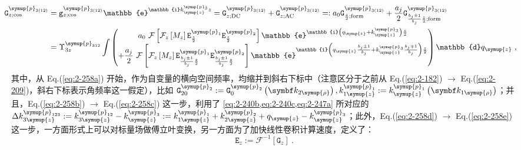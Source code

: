 \begin{subequations} \label{eq:2-261}
	\abovedisplayskip=13pt
	\belowdisplayskip=13pt
	\begin{align}
		\hspace{-0.9em} {\mathtt{G}}^{\symup{p}_{3(12)}}_{z;\cos} &= {\mathtt{g}}^{\symup{p}_{3(12)}}_{z;\cos} \mathbb{e}^{\mathbb{i} k^{\symup{p}_{3}}_{\symup{z}} z } = {\mathtt{G}}^{\symup{p}_{3(12)}}_{z;\text{DC}} + {\mathtt{G}}^{\symup{p}_{3(12)}}_{z;\text{AC}} =: a_0 {\mathtt{G}}^{\symup{p}_{3(12)}}_{\frac{ z }{ 2 };\text{form}} + \frac{ a_j }{ 2 } {\mathtt{G}}^{\symup{p}_{3(12)}}_{\frac{b_j \pm 1}{b_j} \frac{ z }{ 2 };\text{form}} \label{eq:2-261a} \\ \hspace{-0.9em} &= \Upsilon^{\symup{p}_{312}}_{3z} \int \begin{pmatrix} a_0 ~ \mathcal F \left[ \mathcal F_{z} \left[ M_{z} \right] {\mathtt{E}}^{\symup{p}_{1}}_{ \frac{ z }{ 2 }} {\mathtt{E}}^{\symup{p}_{2}}_{ \frac{ z }{ 2 }} \right] \mathbb{e}^{\mathbb{i} \left( q_{\symup{z}} + k^{\symup{p}_{3}}_{\symup{z}} \right) \frac{ z }{ 2 }} \\ + \displaystyle{\frac{ a_j }{ 2 }} ~ \mathcal F \left[ \mathcal F_{z} \left[ M_{z} \right] {\mathtt{E}}^{\symup{p}_{1}}_{\frac{b_j \pm 1}{b_j} \frac{ z }{ 2 }} {\mathtt{E}}^{\symup{p}_{2}}_{\frac{b_j \pm 1}{b_j} \frac{ z }{ 2 }} \right] \mathbb{e}^{\mathbb{i} \left( q_{\symup{z}} \frac{b_j \pm 1}{b_j} + k^{\symup{p}_{3}}_{\symup{z}} \frac{b_j \mp 1}{b_j} \right) \frac{ z }{ 2 }} \end{pmatrix} \mathbb{d}{q_{\symup{z}}} \label{eq:2-261b}~,
	\end{align}
\end{subequations}
其中，从 Eq.(\ref{eq:2-258a}) 开始，作为自变量的横向空间频率，均缩并到斜右下标中（注意区分于之前从 Eq.(\ref{eq:2-182}) $\to$ Eq.(\ref{eq:2-209})，斜右下标表示角频率这一假定），比如 ${\mathtt{G}}^{\symup{p}_{2}}_{20} := {\mathtt{G}}^{\symup{p}_{2}}_{0} \left( \symbf k_{2\symup{\rho}} \right), k^{\symup{p}_{1}}_{1\symup{z}} := k^{\symup{p}_{1}}_{\symup{z}} \left( \symbf k_{1\symup{\rho}} \right)$；并且，Eq.(\ref{eq:2-258b}) $\to$ Eq.(\ref{eq:2-258c}) 这一步，利用了 \cref{eq:2-240b,eq:2-240c,eq:2-247a} 所对应的 $\Delta k^{\symup{p}_{123}}_{3\symup{z}} := k^{\symup{p}_{12}}_{3\symup{z}} - k^{\symup{p}_{3}}_{\symup{z}} := k^{\symup{p}_{1}}_{1\symup{z}} + k^{\symup{p}_{2}}_{2\symup{z}} + q_{\symup{z}} - k^{\symup{p}_{3}}_{\symup{z}}$；此外，Eq.(\ref{eq:2-258d}) $\to$ Eq.(\ref{eq:2-258e}) 这一步，一方面形式上可以对标量场做傅立叶变换，另一方面为了加快线性卷积计算速度，定义了：
\begin{equation} \label{eq:2-262}
	{\mathtt{E}}_{z} := \mathcal F^{-1} \left[ {\mathtt{G}}_{z} \right] ~.
\end{equation}

